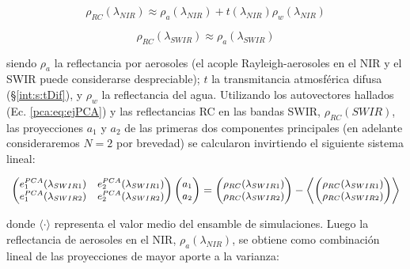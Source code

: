         \begin{equation}
            \rho_{RC}(\lambda_{NIR}) \approx \rho_{a}(\lambda_{NIR}) + t(\lambda_{NIR})\rho_{w}(\lambda_{NIR})
            \label{pca:eq:Nir}
        \end{equation}

        \begin{equation}
            \rho_{RC}(\lambda_{SWIR}) \approx \rho_{a}(\lambda_{SWIR})
            \label{pca:eq:blackSwir}
        \end{equation}
        
        \noindent siendo $\rho_{a}$ la reflectancia por aerosoles (el acople Rayleigh-aerosoles en el NIR y el SWIR puede considerarse despreciable); $t$ la transmitancia atmosférica difusa (\S \ref{int:s:tDif}), y $\rho_{w}$ la reflectancia del agua.
        Utilizando los autovectores hallados (Ec. \ref{pca:eq:ejPCA}) y las reflectancias RC en las bandas SWIR, $\rho_{RC}(SWIR)$, las proyecciones $a_{1}$ y $a_{2}$ de las primeras dos componentes principales (en adelante consideraremos $N=2$ por brevedad) se calcularon invirtiendo el siguiente sistema lineal:
        
        \begin{equation}
            \small
            \begin{pmatrix}
            e_{1}^{PCA}(\lambda_{SWIR1}) & e_{2}^{PCA}(\lambda_{SWIR1})\\ 
            e_{1}^{PCA}(\lambda_{SWIR2}) & e_{2}^{PCA}(\lambda_{SWIR2})
            \end{pmatrix}
            \begin{pmatrix}
            a_{1}\\ 
            a_{2}
            \end{pmatrix}
            = 
            \begin{pmatrix}
            \rho_{RC}(\lambda_{SWIR1})\\ 
            \rho_{RC}(\lambda_{SWIR2})
            \end{pmatrix}
            -
            \left \langle \begin{pmatrix}
            \rho_{RC}(\lambda_{SWIR1})\\ 
            \rho_{RC}(\lambda_{SWIR2})
            \end{pmatrix} \right \rangle
            \label{pca:eq:PCAlinear}
            \normalsize
        \end{equation}
        
        \noindent donde $\langle \cdot \rangle$ representa el valor medio del ensamble de simulaciones. Luego la reflectancia de aerosoles en el NIR, $\rho_{a}(\lambda_{NIR})$, se obtiene como combinación lineal de las proyecciones de mayor aporte a la varianza:
        
